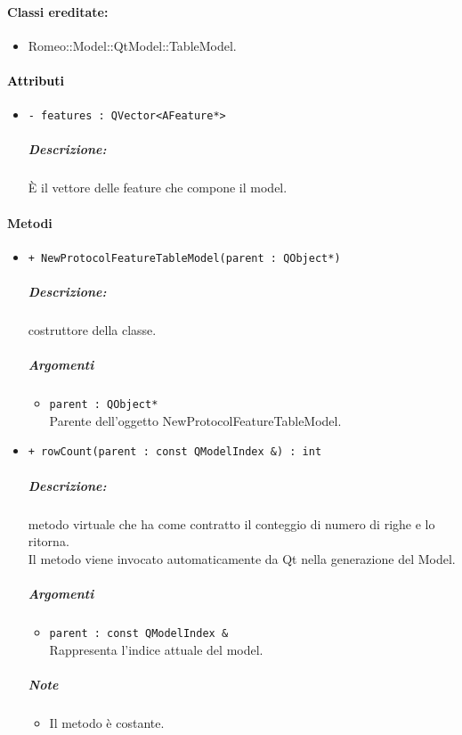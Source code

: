 {\paragraph{Classi ereditate:}
\begin{itemize}
	\item Romeo::Model::QtModel::TableModel.
\end{itemize}

\paragraph{\textcolor{black}{Attributi\\}}
	\begin{itemize}
		\item \color{teal}\verb!- features : QVector<AFeature*>!
		\color{black}
		\subparagraph{Descrizione:} È il vettore delle feature\g{} che compone il model.
	\end{itemize}
	
\paragraph{\color{black}Metodi\\}
\begin{itemize}
	\item \color{blue}\verb!+ NewProtocolFeatureTableModel(parent : QObject*)!\\
		\color{black}
		\subparagraph{Descrizione:} costruttore della classe.\\
		\subparagraph{Argomenti}
			\begin{itemize}
				\item \color{RoyalPurple}\verb!parent : QObject*!\\
				\color{Black}Parente dell'oggetto NewProtocolFeatureTableModel.
			\end{itemize}
			
	\item \color{blue}\verb!+ rowCount(parent : const QModelIndex &) : int!\\
	\color{black}
	\subparagraph{Descrizione:} metodo virtuale che ha come contratto il conteggio di numero di righe e lo ritorna.
	\\Il metodo viene invocato automaticamente da Qt\g{} nella generazione del Model.\\
	\subparagraph{Argomenti}
		\begin{itemize}
			\item \color{RoyalPurple}\verb!parent : const QModelIndex &!\\
			\color{Black}Rappresenta l'indice attuale del model.
		\end{itemize}
	\subparagraph{Note}
			\begin{itemize}
				\item Il metodo è costante.
			\end{itemize}
	

\end{itemize}}
